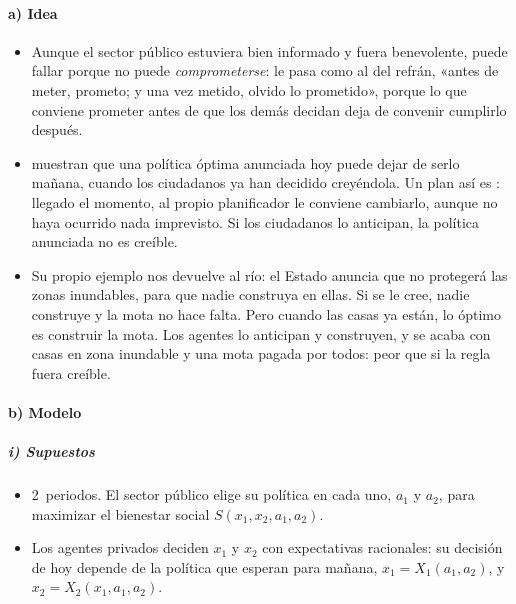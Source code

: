 \documentclass[11pt]{article}
\begin{document}
\paragraph{a) Idea}
\begin{itemize}
\item Aunque el sector público estuviera bien informado y fuera benevolente, puede fallar porque no puede \emph{comprometerse}: le pasa como al del refrán, «antes de meter, prometo; y una vez metido, olvido lo prometido», porque lo que conviene prometer antes de que los demás decidan deja de convenir cumplirlo después.
\item \textcite{KydlandPrescott1977Rules} muestran que una política óptima anunciada hoy puede dejar de serlo mañana, cuando los ciudadanos ya han decidido creyéndola. Un plan así es : llegado el momento, al propio planificador le conviene cambiarlo, aunque no haya ocurrido nada imprevisto. Si los ciudadanos lo anticipan, la política anunciada no es creíble.
\item Su propio ejemplo nos devuelve al río: el Estado anuncia que no protegerá las zonas inundables, para que nadie construya en ellas. Si se le cree, nadie construye y la mota no hace falta. Pero cuando las casas ya están, lo óptimo es construir la mota. Los agentes lo anticipan y construyen, y se acaba con casas en zona inundable y una mota pagada por todos: peor que si la regla fuera creíble.
\end{itemize}

\paragraph{b) Modelo}

\subparagraph{i) Supuestos}
\begin{itemize}
\item 2~periodos. El sector público elige su política en cada uno, $a_1$ y $a_2$, para maximizar el bienestar social $S(x_1,x_2,a_1,a_2)$.
\item Los agentes privados deciden $x_1$ y $x_2$ con expectativas racionales: su decisión de hoy depende de la política que esperan para mañana, $x_1=X_1(a_1,a_2)$, y $x_2=X_2(x_1,a_1,a_2)$.
\end{itemize}
\end{document}
